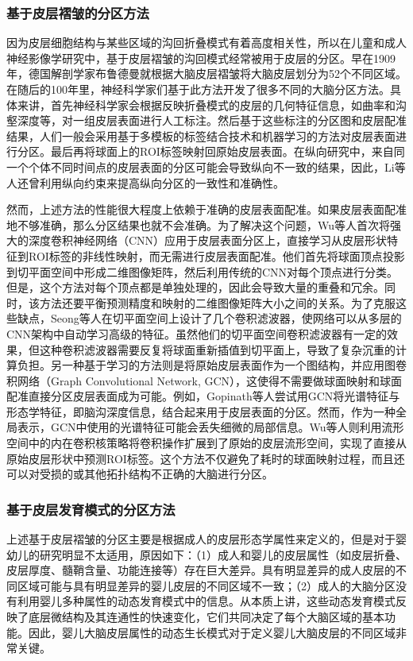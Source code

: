\subsubsection{基于皮层褶皱的分区方法}
因为皮层细胞结构与某些区域的沟回折叠模式有着高度相关性，所以在儿童和成人神经影像学研究中，基于皮层褶皱的沟回模式经常被用于皮层的分区。早在1909年，德国解剖学家布鲁德曼就根据大脑皮层褶皱将大脑皮层划分为52个不同区域\cite{brodmann1909vergleichende}。在随后的100年里，神经科学家们基于此方法开发了很多不同的大脑分区方法\cite{desikan2006automated,li2014measuring}。具体来讲，首先神经科学家会根据反映折叠模式的皮层的几何特征信息，如曲率和沟壑深度等，对一组皮层表面进行人工标注。然后基于这些标注的分区图和皮层配准结果，人们一般会采用基于多模板的标签结合技术和机器学习的方法对皮层表面进行分区。最后再将球面上的ROI标签映射回原始皮层表面\cite{yeo2009spherical,desikan2006automated}。在纵向研究中，来自同一个个体不同时间点的皮层表面的分区可能会导致纵向不一致的结果，因此，Li等人\cite{li2014simultaneous}还曾利用纵向约束来提高纵向分区的一致性和准确性。

然而，上述方法的性能很大程度上依赖于准确的皮层表面配准。如果皮层表面配准地不够准确，那么分区结果也就不会准确。为了解决这个问题，Wu等人\cite{wu2018registration}首次将强大的深度卷积神经网络（CNN）应用于皮层表面分区上，直接学习从皮层形状特征到ROI标签的非线性映射，而无需进行皮层表面配准。他们首先将球面顶点投影到切平面空间中形成二维图像矩阵，然后利用传统的CNN对每个顶点进行分类。但是，这个方法对每个顶点都是单独处理的，因此会导致大量的重叠和冗余。同时，该方法还要平衡预测精度和映射的二维图像矩阵大小之间的关系。为了克服这些缺点，Seong等人\cite{seong2018geometric}在切平面空间上设计了几个卷积滤波器，使网络可以从多层的CNN架构中自动学习高级的特征。虽然他们的切平面空间卷积滤波器有一定的效果，但这种卷积滤波器需要反复将球面重新插值到切平面上，导致了复杂沉重的计算负担。另一种基于学习的方法则是将原始皮层表面作为一个图结构，并应用图卷积网络（Graph Convolutional Network, GCN）\cite{monti2017geometric}，这使得不需要做球面映射和球面配准直接分区皮层表面成为可能。例如，Gopinath等人\cite{gopinath2019graph}尝试用GCN将光谱特征与形态学特征，即脑沟深度信息，结合起来用于皮层表面的分区。然而，作为一种全局表示，GCN中使用的光谱特征可能会丢失细微的局部信息。Wu等人\cite{wu2019intrinsic}则利用流形空间中的内在卷积核策略将卷积操作扩展到了原始的皮层流形空间，实现了直接从原始皮层形状中预测ROI标签。这个方法不仅避免了耗时的球面映射过程，而且还可以对受损的或其他拓扑结构不正确的大脑进行分区。


\subsubsection{基于皮层发育模式的分区方法}
上述基于皮层褶皱的分区主要是根据成人的皮层形态学属性来定义的，但是对于婴幼儿的研究明显不太适用，原因如下：（1）成人和婴儿的皮层属性（如皮层折叠、皮层厚度、髓鞘含量、功能连接等）存在巨大差异。具有明显差异的成人皮层的不同区域可能与具有明显差异的婴儿皮层的不同区域不一致；（2）成人的大脑分区没有利用婴儿多种属性的动态发育模式中的信息。从本质上讲，这些动态发育模式反映了底层微结构及其连通性的快速变化，它们共同决定了每个大脑区域的基本功能。因此，婴儿大脑皮层属性的动态生长模式对于定义婴儿大脑皮层的不同区域非常关键。

